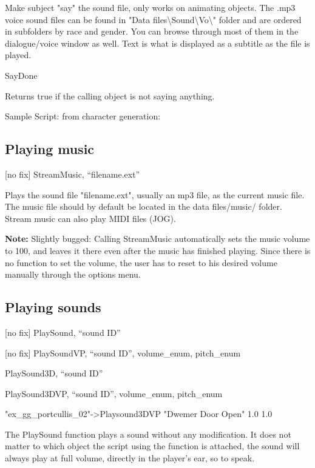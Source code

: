 \documentclass[
]{article}
\begin{document}
Make subject "say" the sound file, only works on animating objects. The
.mp3 voice sound files can be found in "Data
files\textbackslash Sound\textbackslash Vo\textbackslash" folder and are
ordered in subfolders by race and gender. You can browse through most of
them in the dialogue/voice window as well. Text is what is displayed as
a subtitle as the file is played.

SayDone

Returns true if the calling object is not saying anything.

Sample Script: from character generation:



\hypertarget{playing-music}{%
\subsection{Playing music}\label{playing-music}}

{[}no fix{]} StreamMusic, ``filename.ext''

Plays the sound file "filename.ext", usually an mp3 file, as the current
music file. The music file should by default be located in the data
files/music/ folder. Stream music can also play MIDI files (JOG).

\textbf{Note:} Slightly bugged: Calling StreamMusic automatically sets
the music volume to 100, and leaves it there even after the music has
finished playing. Since there is no function to set the volume, the user
has to reset to his desired volume manually through the options menu.

\hypertarget{playing-sounds}{%
\subsection{Playing sounds}\label{playing-sounds}}

{[}no fix{]} PlaySound, ``sound ID''

{[}no fix{]} PlaySoundVP, ``sound ID'', volume\_enum, pitch\_enum

PlaySound3D, ``sound ID''

PlaySound3DVP, ``sound ID'', volume\_enum, pitch\_enum

"ex\_gg\_portcullis\_02"-\textgreater Playsound3DVP "Dwemer Door Open"
1.0 1.0

The PlaySound function plays a sound without any modification. It does
not matter to which object the script using the function is attached,
the sound will always play at full volume, directly in the player's ear,
so to speak.
\end{document}
